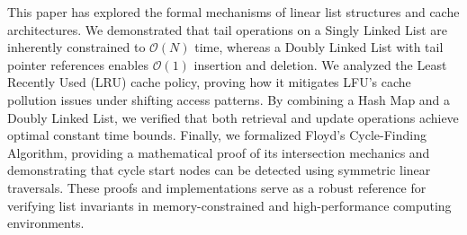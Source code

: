\documentclass[10pt,journal,compsoc,onecolumn]{IEEEtran}
\begin{document}
This paper has explored the formal mechanisms of linear list structures and cache architectures. We demonstrated that tail operations on a Singly Linked List are inherently constrained to $\mathcal{O}(N)$ time, whereas a Doubly Linked List with tail pointer references enables $\mathcal{O}(1)$ insertion and deletion. We analyzed the Least Recently Used (LRU) cache policy, proving how it mitigates LFU's cache pollution issues under shifting access patterns. By combining a Hash Map and a Doubly Linked List, we verified that both retrieval and update operations achieve optimal constant time bounds. Finally, we formalized Floyd's Cycle-Finding Algorithm, providing a mathematical proof of its intersection mechanics and demonstrating that cycle start nodes can be detected using symmetric linear traversals. These proofs and implementations serve as a robust reference for verifying list invariants in memory-constrained and high-performance computing environments.
\end{document}
